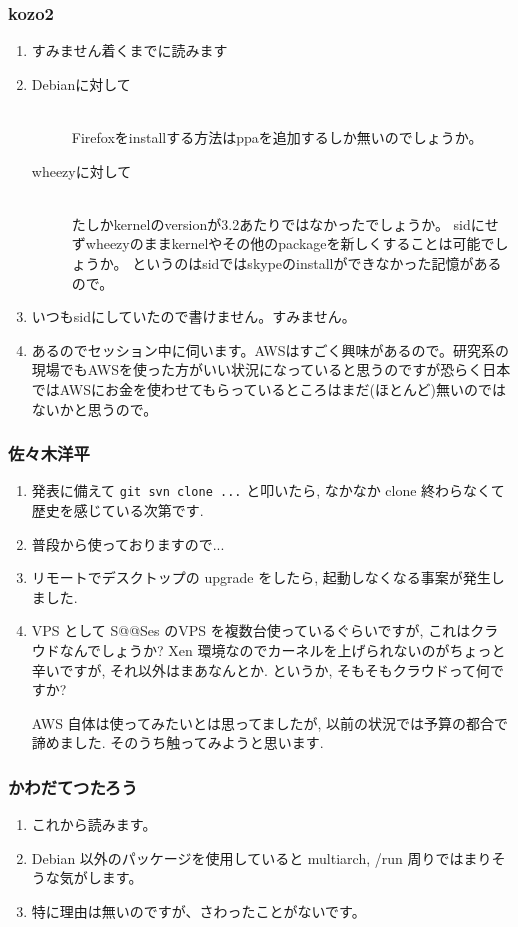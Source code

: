 \documentclass[cjk,dvipdfmx,10pt,compress,%
hyperref={bookmarks=true,bookmarksnumbered=true,bookmarksopen=false,%
colorlinks=false,%
pdftitle={第 71 回 関西 Debian 勉強会},%
pdfauthor={倉敷・のがた・佐々木・かわだ・八津尾},%
pdfsubject={資料},%
}]{beamer}
\begin{document}
\begin{frame}
  \frametitle{ kozo2 }
  \begin{enumerate}
  \item %
    すみません着くまでに読みます
  \item %
    \begin{description}
    \item[Debianに対して]　\\
      Firefoxをinstallする方法はppaを追加するしか無いのでしょうか。
    \item[wheezyに対して]　\\
      たしかkernelのversionが3.2あたりではなかったでしょうか。
      sidにせずwheezyのままkernelやその他のpackageを新しくすることは可能でしょうか。
      というのはsidではskypeのinstallができなかった記憶があるので。
    \end{description}
  \item %
    いつもsidにしていたので書けません。すみません。
  \item %
    あるのでセッション中に伺います。AWSはすごく興味があるので。研究系の現場でもAWSを使った方がいい状況になっていると思うのですが恐らく日本ではAWSにお金を使わせてもらっているところはまだ(ほとんど)無いのではないかと思うので。
  \end{enumerate}
\end{frame}

\begin{frame}
  \frametitle{ 佐々木洋平 }

  \begin{enumerate}
  \item %
    発表に備えて \texttt{git svn clone ...} と叩いたら, なかなか clone 終わらなくて歴史を感じている次第です.
  \item %
    普段から使っておりますので...
  \item %
    リモートでデスクトップの upgrade をしたら, 起動しなくなる事案が発生しました.
  \item %
    VPS として S@@Ses のVPS を複数台使っているぐらいですが, これはクラウドなんでしょうか?
    Xen 環境なのでカーネルを上げられないのがちょっと辛いですが, それ以外はまあなんとか.
    というか,
    そもそもクラウドって何ですか?

    AWS 自体は使ってみたいとは思ってましたが, 以前の状況では予算の都合で諦めました.
    そのうち触ってみようと思います.
  \end{enumerate}
\end{frame}

\begin{frame}\frametitle{ かわだてつたろう }
  \begin{enumerate}
  \item %
    これから読みます。
    \setcounter{enumi}{2}
  \item %
    Debian 以外のパッケージを使用していると multiarch, /run 周りではまりそうな気がします。
  \item %
    特に理由は無いのですが、さわったことがないです。
  \end{enumerate}
\end{frame}
\end{document}
